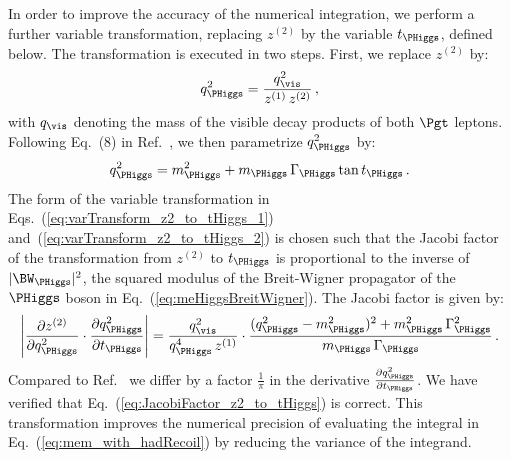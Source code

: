 In order to improve the accuracy of the numerical integration,
we perform a further variable transformation, replacing $z^{(2)}$ by the variable $t_{\PHiggs}$, defined below.
The transformation is executed in two steps. 
First, we replace $z^{(2)}$ by:
\begin{equation}
q_{\PHiggs}^{2} = \frac{q^{2}_{\vis}}{z^{(1)} \, z^{(2)}} \, ,
\label{eq:varTransform_z2_to_tHiggs_1}
\end{equation}
with $q_{\vis}$ denoting the mass of the visible decay products of both
$\Pgt$ leptons.
Following Eq.~(8) in Ref.~\cite{Alwall:2010cq}, we then parametrize $q_{\PHiggs}^{2}$ by:
\begin{equation}
q_{\PHiggs}^{2} = m_{\PHiggs}^{2} + m_{\PHiggs} \, \Gamma_{\PHiggs}
\tan t_{\PHiggs} \, .
\label{eq:varTransform_z2_to_tHiggs_2}
\end{equation}
The form of the variable transformation in Eqs.~(\ref{eq:varTransform_z2_to_tHiggs_1}) and~(\ref{eq:varTransform_z2_to_tHiggs_2}) 
is chosen such that the Jacobi factor of the transformation from
$z^{(2)}$ to $t_{\PHiggs}$ is proportional to the inverse of $\vert \BW_{\PHiggs} \vert^{2}$, 
the squared modulus of the Breit-Wigner propagator of the $\PHiggs$ boson in
Eq.~(\ref{eq:meHiggsBreitWigner}).
The Jacobi factor is given by:
\begin{equation}
\left\lvert \frac{\partial z^{(2)}}{\partial q_{\PHiggs}^{2}} \cdot \frac{\partial
  q_{\PHiggs}^{2}}{\partial t_{\PHiggs}} \right\rvert =
\frac{q^{2}_{\vis}}{q_{\PHiggs}^{4} \, z^{(1)}} \cdot \frac{(q_{\PHiggs}^{2}
  - m_{\PHiggs}^{2})^{2} + m_{\PHiggs}^{2} \,
  \Gamma_{\PHiggs}^{2}}{m_{\PHiggs} \, \Gamma_{\PHiggs}} \, .
\label{eq:JacobiFactor_z2_to_tHiggs}  
\end{equation}
Compared to Ref.~\cite{Alwall:2010cq} we differ by a factor $\frac{1}{\pi}$ in the derivative 
$\frac{\partial q_{\PHiggs}^{2}}{\partial t_{\PHiggs}}$. We have verified that Eq.~(\ref{eq:JacobiFactor_z2_to_tHiggs}) is correct.
This transformation improves the numerical precision of evaluating the integral 
in Eq.~(\ref{eq:mem_with_hadRecoil}) by reducing the variance of the integrand.

